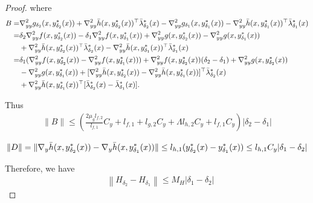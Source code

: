 \documentclass{article}
\newcommand{\pth}[1]{\left( #1 \right)}
\newcommand{\nth}[1]{\left\| #1 \right\|}
\theoremstyle{plain}
\theoremstyle{definition}
\theoremstyle{remark}
\begin{document}
\begin{proof}
where 
\begin{align*}
    B=&\nabla^2_{yy} g_{\delta_2}(x, y^*_{\delta_2}(x))+\nabla^2_{yy}\Bar{h}(x,y^*_{\delta_2}(x))^\top\Bar{\lambda}^*_{\delta_2}(x)-\nabla^2_{yy} g_{\delta_1}(x, y^*_{\delta_1}(x))-\nabla^2_{yy}\Bar{h}(x,y^*_{\delta_1}(x))^\top\Bar{\lambda}^*_{\delta_1}(x)\\
    =&\delta_2 \nabla^2_{yy} f(x, y^*_{\delta_2}(x))-\delta_1 \nabla^2_{yy} f(x, y^*_{\delta_1}(x))+\nabla^2_{yy} g(x, y^*_{\delta_2}(x))-\nabla^2_{yy} g(x, y^*_{\delta_1}(x))\\
    &+\nabla^2_{yy}\Bar{h}(x,y^*_{\delta_2}(x))^\top\Bar{\lambda}^*_{\delta_2}(x)-\nabla^2_{yy}\Bar{h}(x,y^*_{\delta_1}(x))^\top\Bar{\lambda}^*_{\delta_1}(x)\\
    =&\delta_1(\nabla^2_{yy} f(x, y^*_{\delta_2}(x))-\nabla^2_{yy} f(x, y^*_{\delta_1}(x)))+\nabla^2_{yy} f(x, y^*_{\delta_2}(x))(\delta_2-\delta_1)+\nabla^2_{yy} g(x, y^*_{\delta_2}(x))\\
    &-\nabla^2_{yy} g(x, y^*_{\delta_1}(x))+[\nabla^2_{yy}\Bar{h}(x,y^*_{\delta_2}(x))-\nabla^2_{yy}\Bar{h}(x,y^*_{\delta_1}(x))]^\top\Bar{\lambda}^*_{\delta_2}(x)\\
    &+\nabla^2_{yy}\Bar{h}(x,y^*_{\delta_1}(x))^\top[\Bar{\lambda}^*_{\delta_2}(x)-\Bar{\lambda}^*_{\delta_1}(x)].
\end{align*}

Thus
\begin{align*}
    \|B\|\leq \pth{\frac{2\mu_gl_{f,2}}{l_{f,1}}C_y+l_{f,1}+l_{g,2}C_y+\Lambda l_{h,2}C_y+l_{f,1}C_y}|\delta_2-\delta_1|
\end{align*}

\begin{align*}
    \|D\|=\|\nabla_y\Bar{h}(x,y^*_{\delta_2}(x))-\nabla_y\Bar{h}(x,y^*_{\delta_1}(x))\|\leq l_{h,1}(y^*_{\delta_2}(x)-y^*_{\delta_1}(x))\leq l_{h,1}C_y |\delta_1-\delta_2|
\end{align*}

Therefore, we have
\begin{align*}
&\nth{H_{\delta_2}-H_{\delta_1}}\leq M_H|\delta_1-\delta_2|
\end{align*}


\end{proof}
\end{document}
